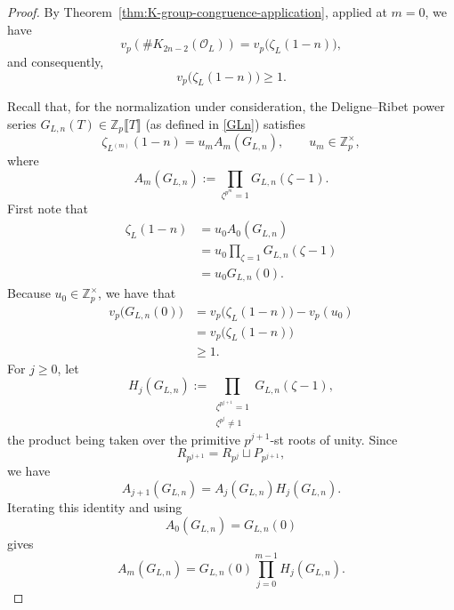 \documentclass[11pt,table]{amsart}
\numberwithin{equation}{section}
\begin{document}
\begin{proof}
By Theorem~\ref{thm:K-group-congruence-application}, applied at
\(m=0\), we have
\[
        v_p\!\left(\#K_{2n-2}(\mathcal O_L)\right)
        =
        v_p\bigl(\zeta_L(1-n)\bigr),
\]
and consequently,
\begin{equation}
        v_p\bigl(\zeta_L(1-n)\bigr)\geq1.
        \label{eq:zeta-base-nonunit}
\end{equation}

Recall that, for the normalization under consideration, the
Deligne--Ribet power series $G_{L,n}(T)\in\mathbb Z_p\llbracket T\rrbracket$ (as defined in \eqref{GLn}) satisfies
\begin{equation}
        \zeta_{L^{(m)}}(1-n)
        =
        u_m A_m(G_{L,n}),
        \qquad
        u_m\in\mathbb Z_p^\times,
        \label{eq:zeta-Am-unit-factor-proof}
\end{equation}
where
\begin{equation}
        A_m(G_{L,n})
        :=
        \prod_{\zeta^{p^m}=1}
        G_{L,n}(\zeta-1).
        \label{eq:Am-GLn-proof}
\end{equation}
First note that
\[
\begin{aligned}
        \zeta_L(1-n)
        &=
        u_0A_0(G_{L,n})\\
        &=
        u_0
        \prod_{\zeta=1}
        G_{L,n}(\zeta-1)\\
        &=
        u_0G_{L,n}(0).
\end{aligned}
\]
Because \(u_0\in\mathbb Z_p^\times\), we have that
\[
\begin{aligned}
        v_p\bigl(G_{L,n}(0)\bigr)
        &=
        v_p\bigl(\zeta_L(1-n)\bigr)-v_p(u_0)\\
        &=
        v_p\bigl(\zeta_L(1-n)\bigr)\\
        &\geq1.
\end{aligned}
\]
For
\(j\geq0\), let
\[
        H_j(G_{L,n})
        :=
        \prod_{\substack{\zeta^{p^{j+1}}=1\\
                         \zeta^{p^j}\neq1}}
        G_{L,n}(\zeta-1),
\]
the product being taken over the primitive \(p^{j+1}\)-st roots of
unity.  Since
\[
        R_{p^{j+1}}
        =
        R_{p^j}\sqcup P_{p^{j+1}},
\]
we have
\[
        A_{j+1}(G_{L,n})
        =
        A_j(G_{L,n})H_j(G_{L,n}).
\]
Iterating this identity and using
\[
        A_0(G_{L,n})=G_{L,n}(0)
\]
gives
\begin{equation}
        A_m(G_{L,n})
        =
        G_{L,n}(0)
        \prod_{j=0}^{m-1}H_j(G_{L,n}).

\end{equation}
\end{proof}
\end{document}
